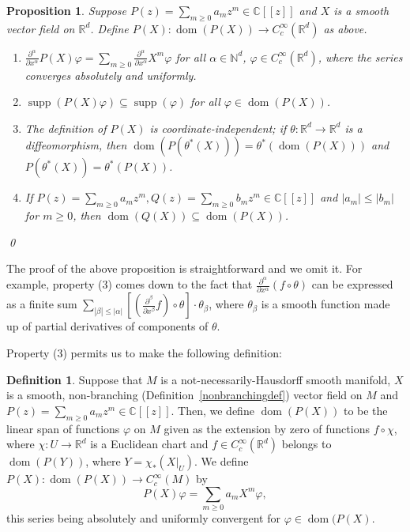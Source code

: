 \documentclass[12pt]{article}
\theoremstyle{plain}
\newtheorem{propn}[thm]{Proposition}
\theoremstyle{definition}
\newtheorem{defn}[thm]{Definition}
\newcommand{\R}{\mathbb{R}}
\newcommand{\C}{\mathbb{C}}
\newcommand{\N}{\mathbb{N}}
\newcommand{\dom}{\operatorname{dom}}
\newcommand{\supp}{\operatorname{supp}}
\numberwithin{equation}{section}
\begin{document}
\begin{propn}
Suppose $P(z) = \sum_{m \geq 0} a_m z^m \in \C[[z]]$ and  $X$ is a smooth vector field on $\R^d$. Define $P(X) : \dom(P(X)) \to C_c^\infty(\R^d)$ as above.
\begin{enumerate}
\item $\frac{\partial^\alpha}{\partial x^\alpha} P(X) \varphi = \sum_{m\geq0} \frac{\partial^\alpha}{\partial x^\alpha} X^m \varphi$ for all $\alpha \in \N^d$, $\varphi \in C_c^\infty(\R^d)$, where  the series converges absolutely and uniformly.
\item $\supp(P(X)\varphi) \subseteq \supp(\varphi)$ for all $\varphi \in \dom(P(X))$.
\item The definition of $P(X)$ is coordinate-independent; if $\theta : \R^d \to \R^d$ is a diffeomorphism, then $\dom(P(\theta^*(X))) = \theta^*(\dom(P(X)))$ and $P(\theta^*(X)) = \theta^*(P(X))$.
\item If $P(z) = \sum_{m \geq 0} a_m z^m, Q(z) = \sum_{m \geq 0} b_m z^m \in \C[[z]]$ and $|a_m|\leq|b_m|$ for $m\geq 0$, then $\dom(Q(X)) \subseteq \dom(P(X))$.
\end{enumerate}\qed
\end{propn}
The proof of the above proposition is straightforward and we omit it. For example, property (3) comes down to the fact that $\frac{\partial^\alpha}{\partial x^\alpha} (f \circ \theta)$ can be expressed as a finite sum $\sum_{|\beta|\leq|\alpha|} \left[ (\frac{\partial^\beta}{\partial x^\beta} f) \circ \theta \right] \cdot \theta_\beta$, where $\theta_\beta$ is a smooth function made up of partial derivatives of components of $\theta$. 

Property (3) permits us to make the following definition:

\begin{defn}
Suppose that $M$ is a not-necessarily-Hausdorff smooth manifold, $X$ is a smooth, non-branching (Definition~\ref{nonbranchingdef}) vector field on $M$ and $P(z) = \sum_{m \geq 0} a_m z^m \in \C[[z]]$.  Then, we define $\dom(P(X))$ to be the linear span of functions $\varphi$ on $M$ given as the extension by zero of functions $f \circ \chi$, where  $\chi : U \to \R^d$ is a Euclidean chart and $f \in C_c^\infty(\R^d)$ belongs to $\dom(P(Y))$, where $Y=\chi_*(X|_U)$.  We define $P(X) :  \dom(P(X)) \to C_c^\infty(M)$ by 
\[ P(X)\varphi = \sum_{m \geq 0} a_m X^m \varphi, \]
this series being absolutely and uniformly convergent for  $\varphi \in \dom(P(X)$.
\end{defn}
\end{document}

